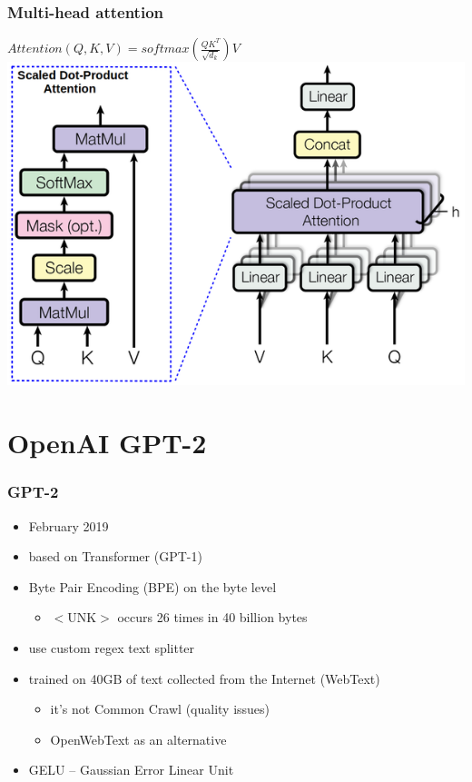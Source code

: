 \documentclass{beamer}
\begin{document}
\begin{frame}
    \frametitle{Multi-head attention}
    \begin{center}
        $ Attention (Q, K, V) = softmax(\frac{QK^T}{\sqrt{d_k}})V $ \\
        \includegraphics[scale=0.45]{img/multi_head_attention.png}
    \end{center}
\end{frame}



\section{OpenAI GPT-2}
\begin{frame}
    \frametitle{GPT-2 \cite{gpt2}}
    \begin{itemize}
        \item February 2019
        \item based on Transformer \cite{transformer} (GPT-1)
        \item Byte Pair Encoding (BPE) \cite{bpe} on the byte level
        \begin{itemize}
        	\item $<$UNK$>$ occurs 26 times in 40 billion bytes
        \end{itemize}
        \item use custom regex text splitter
        \item trained on 40GB of text collected from the Internet (WebText)
        \begin{itemize}
        	\item it's not Common Crawl (quality issues)
        	\item OpenWebText as an alternative
        \end{itemize}
        \item GELU -- Gaussian Error Linear Unit \cite{gelu}
    \end{itemize}
\end{frame}
\end{document}
